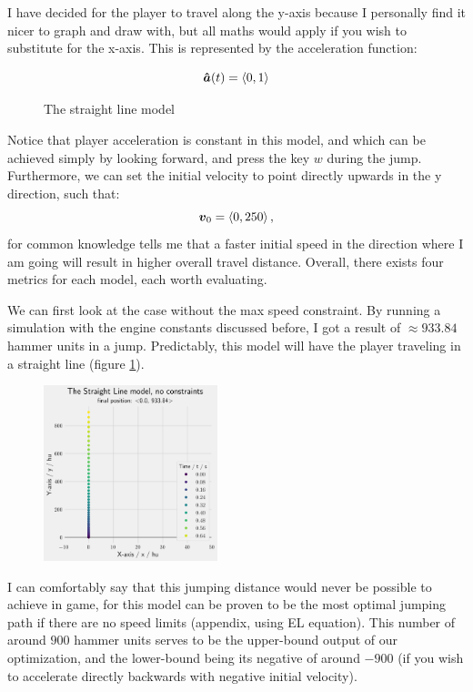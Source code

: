 I have decided for the player to travel along the y-axis because I personally find it nicer to graph and draw with, but all maths would apply if you wish to substitute for the x-axis. This is represented by the acceleration function:

\begin{figure}[H]
    \centering
    \[
    \boldsymbol{\hat{a}}(t) = \left\langle 0, 1 \right\rangle
    \]
    \caption{The straight line model}
\end{figure}

Notice that player acceleration is constant in this model, and which can be achieved simply by looking forward, and press the key $w$ during the jump. Furthermore, we can set the initial velocity to point directly upwards in the y direction, such that:
\[
\boldsymbol{v}_0 = \left\langle 0, 250 \right\rangle,
\]
for common knowledge tells me that a faster initial speed in the direction where I am going will result in higher overall travel distance. Overall, there exists four metrics for each model, each worth evaluating.

We can first look at the case without the max speed constraint. By running a simulation with the engine constants discussed before, I got a result of $\approx 933.84$ hammer units in a jump. Predictably, this model will have the player traveling in a straight line (figure \ref{fig:straight_nothing_1}).

\begin{figure}
    \includegraphics[width=0.45\textwidth,right]{assets/straight_nothing_1.png}
    \caption{}
    \label{fig:straight_nothing_1}
\end{figure}

I can comfortably say that this jumping distance would never be possible to achieve in game, for this model can be proven to be the most optimal jumping path if there are no speed limits (appendix, using EL equation). This number of around $900$ hammer units serves to be the upper-bound output of our optimization, and the lower-bound being its negative of around $-900$ (if you wish to accelerate directly backwards with negative initial velocity).

